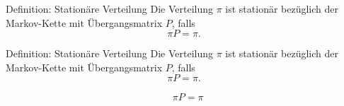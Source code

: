 \documentclass[t,11pt]{beamer}
\begin{document}
\begin{frame}
	\begin{alertblock}{Definition: Stationäre Verteilung}
		Die Verteilung $\pi$ ist stationär bezüglich der Markov-Kette mit Übergangsmatrix $P$, falls $$\pi P = \pi.$$
	\end{alertblock}
\end{frame}

\begin{frame}
\begin{alertblock}{Definition: Stationäre Verteilung}
	Die Verteilung $\pi$ ist stationär bezüglich der Markov-Kette mit Übergangsmatrix $P$, falls $$\pi P = \pi.$$
\end{alertblock}
\begin{align*}
&\pi P = \pi \\
\end{align*}
\end{frame}
\end{document}
